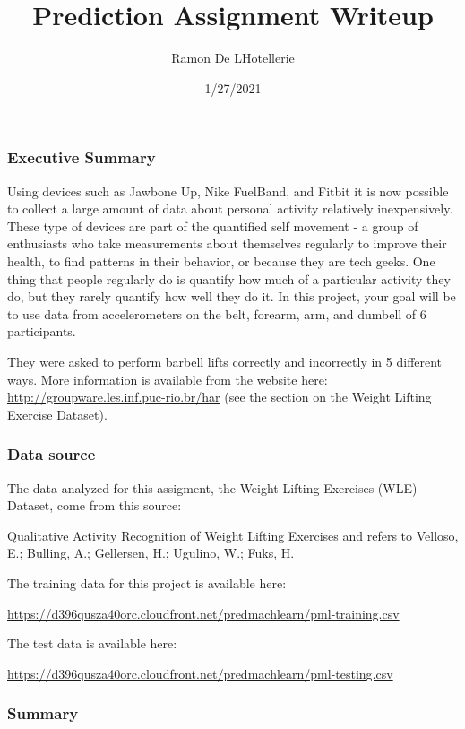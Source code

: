 \documentclass[]{article}
\title{Prediction Assignment Writeup}
\author{Ramon De LHotellerie}
\date{1/27/2021}
\begin{document}
\maketitle

\hypertarget{executive-summary}{%
\subsubsection{Executive Summary}\label{executive-summary}}

Using devices such as Jawbone Up, Nike FuelBand, and Fitbit it is now
possible to collect a large amount of data about personal activity
relatively inexpensively. These type of devices are part of the
quantified self movement - a group of enthusiasts who take measurements
about themselves regularly to improve their health, to find patterns in
their behavior, or because they are tech geeks. One thing that people
regularly do is quantify how much of a particular activity they do, but
they rarely quantify how well they do it. In this project, your goal
will be to use data from accelerometers on the belt, forearm, arm, and
dumbell of 6 participants.

They were asked to perform barbell lifts correctly and incorrectly in 5
different ways. More information is available from the website here:
\url{http://groupware.les.inf.puc-rio.br/har} (see the section on the
Weight Lifting Exercise Dataset).

\hypertarget{data-source}{%
\subsubsection{Data source}\label{data-source}}

The data analyzed for this assigment, the Weight Lifting Exercises (WLE)
Dataset, come from this source:

\href{http://groupware.les.inf.puc-rio.br/har}{Qualitative Activity
Recognition of Weight Lifting Exercises} and refers to Velloso, E.;
Bulling, A.; Gellersen, H.; Ugulino, W.; Fuks, H.

The training data for this project is available here:

\url{https://d396qusza40orc.cloudfront.net/predmachlearn/pml-training.csv}

The test data is available here:

\url{https://d396qusza40orc.cloudfront.net/predmachlearn/pml-testing.csv}

\hypertarget{summary}{%
\subsubsection{Summary}\label{summary}}
\end{document}
